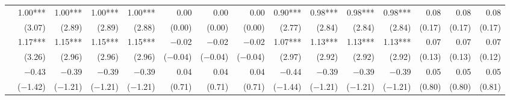 \begin{tabularx}{1.45\textwidth}{lRRRRRRRRRRRRRR}
		 & \num{1.00}***\phantom{)} & \num{1.00}***\phantom{)} & \num{1.00}***\phantom{)} & \num{1.00}***\phantom{)} & \num{0.00}\phantom{***)} & \num{0.00}\phantom{***)} & \num{0.00}\phantom{***)} & \num{0.90}***\phantom{)} & \num{0.98}***\phantom{)} & \num{0.98}***\phantom{)} & \num{0.98}***\phantom{)} & \num{0.08}\phantom{***)} & \num{0.08}\phantom{***)} & \num{0.08}\phantom{***)} \\
		 & (\num{3.07})\phantom{***} & (\num{2.89})\phantom{***} & (\num{2.89})\phantom{***} & (\num{2.88})\phantom{***} & (\num{0.00})\phantom{***} & (\num{0.00})\phantom{***} & (\num{0.00})\phantom{***} & (\num{2.77})\phantom{***} & (\num{2.84})\phantom{***} & (\num{2.84})\phantom{***} & (\num{2.84})\phantom{***} & (\num{0.17})\phantom{***} & (\num{0.17})\phantom{***} & (\num{0.17})\phantom{***} \\ [\dspacing]
		 & \num{1.17}***\phantom{)} & \num{1.15}***\phantom{)} & \num{1.15}***\phantom{)} & \num{1.15}***\phantom{)} & \num{-0.02}\phantom{***)} & \num{-0.02}\phantom{***)} & \num{-0.02}\phantom{***)} & \num{1.07}***\phantom{)} & \num{1.13}***\phantom{)} & \num{1.13}***\phantom{)} & \num{1.13}***\phantom{)} & \num{0.07}\phantom{***)} & \num{0.07}\phantom{***)} & \num{0.07}\phantom{***)} \\
		 & (\num{3.26})\phantom{***} & (\num{2.96})\phantom{***} & (\num{2.96})\phantom{***} & (\num{2.96})\phantom{***} & (\num{-0.04})\phantom{***} & (\num{-0.04})\phantom{***} & (\num{-0.04})\phantom{***} & (\num{2.97})\phantom{***} & (\num{2.92})\phantom{***} & (\num{2.92})\phantom{***} & (\num{2.92})\phantom{***} & (\num{0.13})\phantom{***} & (\num{0.13})\phantom{***} & (\num{0.12})\phantom{***} \\ [\dspacing]
		 & \num{-0.43}\phantom{***)} & \num{-0.39}\phantom{***)} & \num{-0.39}\phantom{***)} & \num{-0.39}\phantom{***)} & \num{0.04}\phantom{***)} & \num{0.04}\phantom{***)} & \num{0.04}\phantom{***)} & \num{-0.44}\phantom{***)} & \num{-0.39}\phantom{***)} & \num{-0.39}\phantom{***)} & \num{-0.39}\phantom{***)} & \num{0.05}\phantom{***)} & \num{0.05}\phantom{***)} & \num{0.05}\phantom{***)} \\
		 & (\num{-1.42})\phantom{***} & (\num{-1.21})\phantom{***} & (\num{-1.21})\phantom{***} & (\num{-1.21})\phantom{***} & (\num{0.71})\phantom{***} & (\num{0.71})\phantom{***} & (\num{0.71})\phantom{***} & (\num{-1.44})\phantom{***} & (\num{-1.21})\phantom{***} & (\num{-1.21})\phantom{***} & (\num{-1.21})\phantom{***} & (\num{0.80})\phantom{***} & (\num{0.80})\phantom{***} & (\num{0.81})\phantom{***} \\ [\dspacing]


\end{tabularx}
